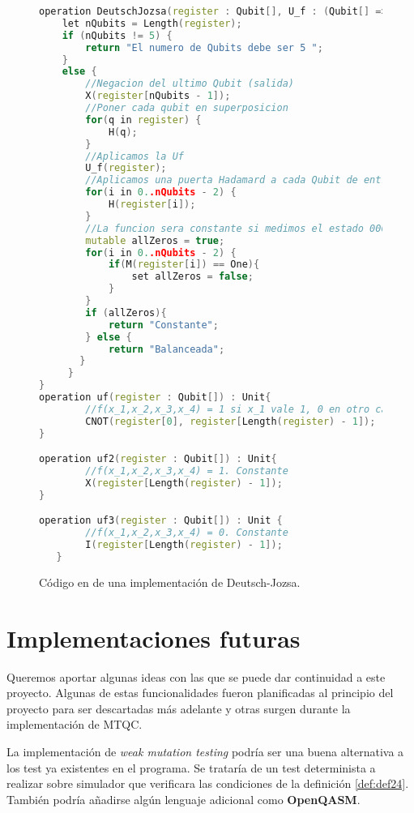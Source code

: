 \begin{figure}[htb]
\begin{lstlisting}[language=c++]
operation DeutschJozsa(register : Qubit[], U_f : (Qubit[] => Unit)) : String {  
    let nQubits = Length(register);
    if (nQubits != 5) {
   		return "El numero de Qubits debe ser 5 ";
    }
    else {
        //Negacion del ultimo Qubit (salida)
        X(register[nQubits - 1]); 
        //Poner cada qubit en superposicion
        for(q in register) {
        	H(q);
        }         
        //Aplicamos la Uf
        U_f(register);
        //Aplicamos una puerta Hadamard a cada Qubit de entrada
        for(i in 0..nQubits - 2) {
        	H(register[i]);
        }        
        //La funcion sera constante si medimos el estado 0000. Balanceada en otro caso.
        mutable allZeros = true;
        for(i in 0..nQubits - 2) {
           	if(M(register[i]) == One){
            	set allZeros = false;
            }
        } 
        if (allZeros){
        	return "Constante";
        } else {
       		return "Balanceada";
       }
     }  
}
operation uf(register : Qubit[]) : Unit{
		//f(x_1,x_2,x_3,x_4) = 1 si x_1 vale 1, 0 en otro caso. Balanceada
		CNOT(register[0], register[Length(register) - 1]);
}

operation uf2(register : Qubit[]) : Unit{
		//f(x_1,x_2,x_3,x_4) = 1. Constante
		X(register[Length(register) - 1]);
}

operation uf3(register : Qubit[]) : Unit { 
		//f(x_1,x_2,x_3,x_4) = 0. Constante  
		I(register[Length(register) - 1]);
   }
\end{lstlisting}
\caption{Código en \qsh de una implementación de Deutsch-Jozsa.}
\end{figure}

\section{Implementaciones futuras}

Queremos aportar algunas ideas con las que se puede dar continuidad a este proyecto. Algunas de estas funcionalidades fueron planificadas al principio del proyecto para ser descartadas más adelante y otras surgen durante la implementación de MTQC.

La implementación de \textit{weak mutation testing} podría ser una buena alternativa a los test ya existentes en el programa. Se trataría de un test determinista a realizar sobre simulador que verificara las condiciones de la definición \ref{def:def24}. También podría añadirse algún lenguaje adicional como \textbf{OpenQASM}.

